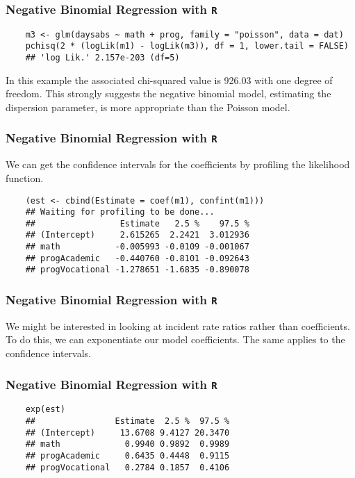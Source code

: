 \documentclass[00-GLMregslides.tex]{subfiles}
\begin{document}
\begin{frame}[fragile]
	\frametitle{Negative Binomial Regression with \texttt{R} }
	\large
	\begin{verbatim}
	m3 <- glm(daysabs ~ math + prog, family = "poisson", data = dat)
	pchisq(2 * (logLik(m1) - logLik(m3)), df = 1, lower.tail = FALSE)
	## 'log Lik.' 2.157e-203 (df=5)
	\end{verbatim}
	\Large
	In this example the associated chi-squared value is 926.03 with one degree of freedom. This strongly suggests the negative binomial model, estimating the dispersion parameter, is more appropriate than the Poisson model.
\end{frame}
\begin{frame}[fragile]
	\frametitle{Negative Binomial Regression with \texttt{R} }
	\Large
	
	We can get the confidence intervals for the coefficients by profiling the likelihood function.
	\begin{verbatim}
	(est <- cbind(Estimate = coef(m1), confint(m1)))
	## Waiting for profiling to be done...
	##                 Estimate   2.5 %    97.5 %
	## (Intercept)     2.615265  2.2421  3.012936
	## math           -0.005993 -0.0109 -0.001067
	## progAcademic   -0.440760 -0.8101 -0.092643
	## progVocational -1.278651 -1.6835 -0.890078
	\end{verbatim}
	
\end{frame}
\begin{frame}[fragile]
	\frametitle{Negative Binomial Regression with \texttt{R} }
	\Large
	
	We might be interested in looking at incident rate ratios rather than coefficients. To do this, we can exponentiate our model coefficients. The same applies to the confidence intervals.
\end{frame}
\begin{frame}[fragile]
	\frametitle{Negative Binomial Regression with \texttt{R} }
	\Large
	\begin{verbatim}	
	exp(est)
	##                Estimate  2.5 %  97.5 %
	## (Intercept)     13.6708 9.4127 20.3470
	## math             0.9940 0.9892  0.9989
	## progAcademic     0.6435 0.4448  0.9115
	## progVocational   0.2784 0.1857  0.4106
	\end{verbatim}
\end{frame}
\end{document}
